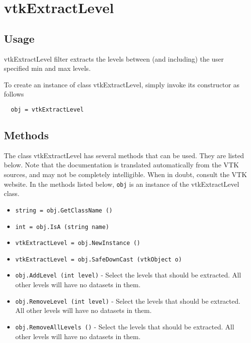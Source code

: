 \section{vtkExtractLevel}

\subsection{Usage}

 vtkExtractLevel filter extracts the levels between (and including) the user
 specified min and max levels.

To create an instance of class vtkExtractLevel, simply
invoke its constructor as follows
\begin{verbatim}
  obj = vtkExtractLevel
\end{verbatim}
\subsection{Methods}

The class vtkExtractLevel has several methods that can be used.
  They are listed below.
Note that the documentation is translated automatically from the VTK sources,
and may not be completely intelligible.  When in doubt, consult the VTK website.
In the methods listed below, \verb|obj| is an instance of the vtkExtractLevel class.
\begin{itemize}
\item  \verb|string = obj.GetClassName ()|

\item  \verb|int = obj.IsA (string name)|

\item  \verb|vtkExtractLevel = obj.NewInstance ()|

\item  \verb|vtkExtractLevel = obj.SafeDownCast (vtkObject o)|

\item  \verb|obj.AddLevel (int level)| -  Select the levels that should be extracted. All other levels will have no
 datasets in them.

\item  \verb|obj.RemoveLevel (int level)| -  Select the levels that should be extracted. All other levels will have no
 datasets in them.

\item  \verb|obj.RemoveAllLevels ()| -  Select the levels that should be extracted. All other levels will have no
 datasets in them.

\end{itemize}
